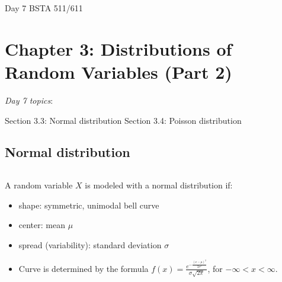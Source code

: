 \documentclass[12pt]{amsart}
\newtheorem{example}[theorem]{Example}
\newcommand{\m}{\mu}
\newcommand{\s}{\sigma}
\begin{document}
\setcounter{section}{3}
\setcounter{subsection}{2}
Day 7 BSTA 511/611
{\huge  
\section*{Chapter 3: Distributions of Random Variables (Part 2)}
}



{\large 

\emph{Day 7 topics}:

Section 3.3: Normal distribution  \newline
Section 3.4: Poisson distribution

\hrulefill

%
%
%
%
%
%






\vspace{.5cm}

\subsection{Normal distribution} $\ $ \newline

A random variable $X$ is modeled with a normal distribution if:
\begin{itemize}
\item shape: symmetric, unimodal bell curve
\item center: mean $\m$
\item spread (variability): standard deviation $\s$
\item Curve is determined by the formula $f(x) = \frac{e^{-\frac{(x-\m)^2}{2\s^2}}}{\s\sqrt{2\pi}}$, for $-\infty < x< \infty$.


\end{itemize}}
\end{document}
